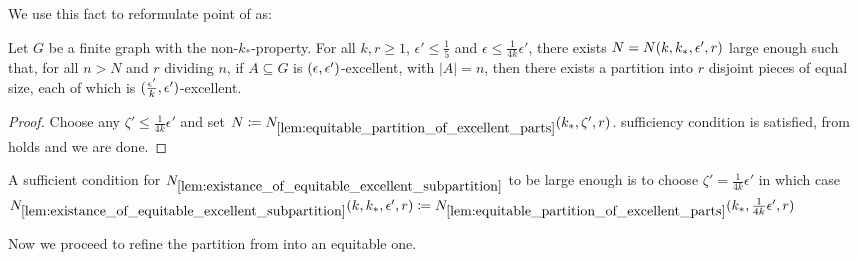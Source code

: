         We use this fact to reformulate point  of
         as:

        \begin{lemma}[Claim 5.13.2(3)] \label{lem:existance_of_equitable_excellent_subpartition}
            Let $G$ be a finite graph with the non-$k_*$-property.
            For all $k, r \geq 1$, $\epsilon' \leq \frac{1}{5}$ and $\epsilon \leq \frac{1}{4k} \epsilon'$, there exists
            $N = N( k, k_*, \epsilon', r )$ large enough such that, for all $n > N$ and $r$ dividing $n$,
            if $A \subseteq G$ is $( \epsilon, \epsilon' )$-excellent, with $|A| = n$, then there exists a
            partition into $r$ disjoint pieces of equal size, each of which is $( \frac{\epsilon'}{k}, \epsilon' )$-excellent.
            \begin{proof}
                Choose any $\zeta' \leq \frac{1}{4k} \epsilon'$ and set
                $N \coloneqq N_{\ref{lem:equitable_partition_of_excellent_parts}}( k_*, \zeta', r )$.
                 sufficiency condition is satisfied,
                 from 
                holds and we are done.
            \end{proof}
        \end{lemma}

        \begin{remark}
            A sufficient condition for $N_{\ref{lem:existance_of_equitable_excellent_subpartition}}$ to be large enough is
            to choose $\zeta' = \frac{1}{4k} \epsilon'$ in which case
            $N_{\ref{lem:existance_of_equitable_excellent_subpartition}}( k, k_*, \epsilon', r ) \coloneqq
            N_{\ref{lem:equitable_partition_of_excellent_parts}}( k_*, \frac{1}{4k} \epsilon', r )$
        \end{remark}

        Now we proceed to refine the partition from  into an equitable one.

